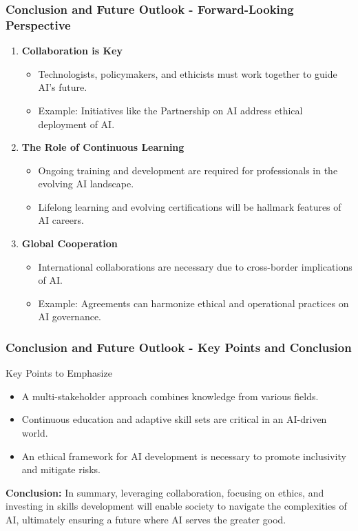 \documentclass{beamer}
\begin{document}
\begin{frame}[fragile]
    \frametitle{Conclusion and Future Outlook - Forward-Looking Perspective}

    \begin{enumerate}
        \item \textbf{Collaboration is Key}
        \begin{itemize}
            \item Technologists, policymakers, and ethicists must work together to guide AI's future.
            \item Example: Initiatives like the Partnership on AI address ethical deployment of AI.
        \end{itemize}

        \item \textbf{The Role of Continuous Learning}
        \begin{itemize}
            \item Ongoing training and development are required for professionals in the evolving AI landscape.
            \item Lifelong learning and evolving certifications will be hallmark features of AI careers.
        \end{itemize}

        \item \textbf{Global Cooperation}
        \begin{itemize}
            \item International collaborations are necessary due to cross-border implications of AI.
            \item Example: Agreements can harmonize ethical and operational practices on AI governance.
        \end{itemize}
    \end{enumerate}
\end{frame}

\begin{frame}[fragile]
    \frametitle{Conclusion and Future Outlook - Key Points and Conclusion}

    \begin{block}{Key Points to Emphasize}
        \begin{itemize}
            \item A multi-stakeholder approach combines knowledge from various fields.
            \item Continuous education and adaptive skill sets are critical in an AI-driven world.
            \item An ethical framework for AI development is necessary to promote inclusivity and mitigate risks.
        \end{itemize}
    \end{block}

    \textbf{Conclusion:} In summary, leveraging collaboration, focusing on ethics, and investing in skills development will enable society to navigate the complexities of AI, ultimately ensuring a future where AI serves the greater good.
\end{frame}
\end{document}

